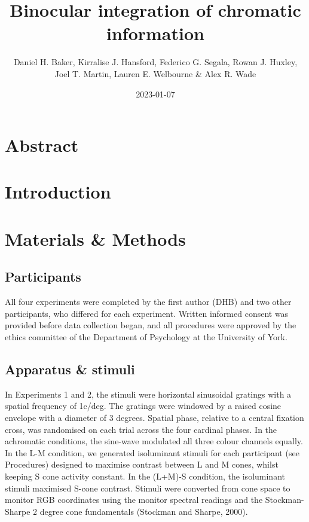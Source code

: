 \documentclass[
]{article}
\title{Binocular integration of chromatic information}
\author{Daniel H. Baker, Kirralise J. Hansford, Federico G. Segala, Rowan J. Huxley,\\
Joel T. Martin, Lauren E. Welbourne \& Alex R. Wade}
\date{2023-01-07}
\begin{document}
\maketitle

\hypertarget{abstract}{%
\section{Abstract}\label{abstract}}

\hypertarget{introduction}{%
\section{Introduction}\label{introduction}}

\hypertarget{materials-methods}{%
\section{Materials \& Methods}\label{materials-methods}}

\hypertarget{participants}{%
\subsection{Participants}\label{participants}}

All four experiments were completed by the first author (DHB) and two other participants, who differed for each experiment. Written informed consent was provided before data collection began, and all procedures were approved by the ethics committee of the Department of Psychology at the University of York.

\hypertarget{apparatus-stimuli}{%
\subsection{Apparatus \& stimuli}\label{apparatus-stimuli}}

In Experiments 1 and 2, the stimuli were horizontal sinusoidal gratings with a spatial frequency of 1c/deg. The gratings were windowed by a raised cosine envelope with a diameter of 3 degrees. Spatial phase, relative to a central fixation cross, was randomised on each trial across the four cardinal phases. In the achromatic conditions, the sine-wave modulated all three colour channels equally. In the L-M condition, we generated isoluminant stimuli for each participant (see Procedures) designed to maximise contrast between L and M cones, whilst keeping S cone activity constant. In the (L+M)-S condition, the isoluminant stimuli maximised S-cone contrast. Stimuli were converted from cone space to monitor RGB coordinates using the monitor spectral readings and the Stockman-Sharpe 2 degree cone fundamentals (Stockman and Sharpe, 2000).
\end{document}
